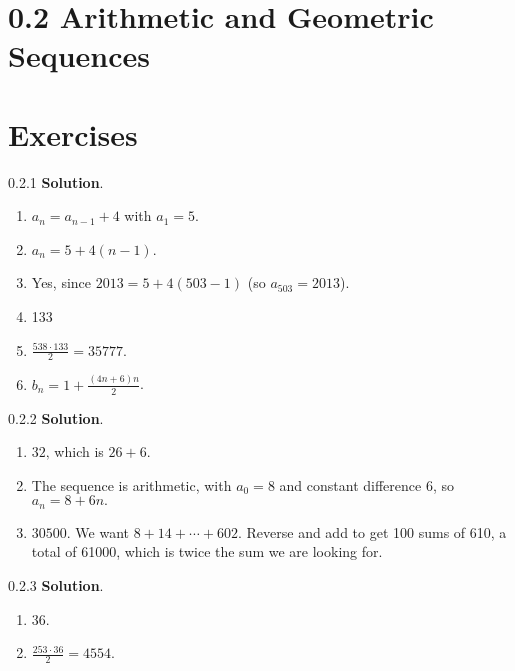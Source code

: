 \documentclass[11pt,]{book}
\theoremstyle{ptxplainnotitle}
\theoremstyle{ptxplaintitle}
\theoremstyle{ptxdefinitionnotitle}
\theoremstyle{ptxdefinitiontitle}
\theoremstyle{ptxdefinitionnotitle}
\theoremstyle{ptxdefinitiontitle}
\theoremstyle{ptxdefinitionnotitle}
\theoremstyle{ptxdefinitiontitle}
\theoremstyle{ptxdefinitiontitlenonumber}
\theoremstyle{ptxdefinitiontitlenonumber}
\numberwithin{equation}{chapter}
\begin{document}
\section*{0.2 Arithmetic and Geometric Sequences}
\section*{Exercises}
\begin{divisionexercise}{0.2.1}
\textbf{Solution}.\quad%
\hypertarget{p-233}{}%
\leavevmode%
\begin{enumerate}[label=(\alph*)]
\item\hypertarget{li-133}{}\(a_n = a_{n-1} + 4\) with \(a_1 = 5\).%
\item\hypertarget{li-134}{}\(a_n = 5 + 4(n-1)\).%
\item\hypertarget{li-135}{}\hypertarget{p-234}{}%
Yes, since \(2013 = 5 + 4(503-1)\) (so \(a_{503} = 2013\)).%
\item\hypertarget{li-136}{}\hypertarget{p-235}{}%
133%
\item\hypertarget{li-137}{}\(\frac{538\cdot 133}{2} = 35777\).%
\item\hypertarget{li-138}{}\(b_n = 1 + \frac{(4n+6)n}{2}\).%
\end{enumerate}
%
\end{divisionexercise}%
\begin{divisionexercise}{0.2.2}
\textbf{Solution}.\quad%
\hypertarget{p-252}{}%
\leavevmode%
\begin{enumerate}[label=\alph*.]
\item\hypertarget{li-148}{}\hypertarget{p-253}{}%
\(32\text{,}\) which is \(26+6\text{.}\)%
\item\hypertarget{li-149}{}\hypertarget{p-254}{}%
The sequence is arithmetic, with \(a_0 = 8\) and constant difference 6, so \(a_n = 8 + 6n\text{.}\)%
\item\hypertarget{li-150}{}\hypertarget{p-255}{}%
\(30500\text{.}\)  We want \(8 + 14 + \cdots + 602\text{.}\)  Reverse and add to get 100 sums of 610, a total of 61000, which is twice the sum we are looking for.%
\end{enumerate}
%
\end{divisionexercise}%
\begin{divisionexercise}{0.2.3}
\textbf{Solution}.\quad%
\hypertarget{p-270}{}%
\leavevmode%
\begin{enumerate}[label=\alph*.]
\item\hypertarget{li-157}{}\hypertarget{p-271}{}%
36.%
\item\hypertarget{li-158}{}\hypertarget{p-272}{}%
\(\frac{253 \cdot 36}{2} = 4554\text{.}\)%
\end{enumerate}
%
\end{divisionexercise}%
\end{document}
